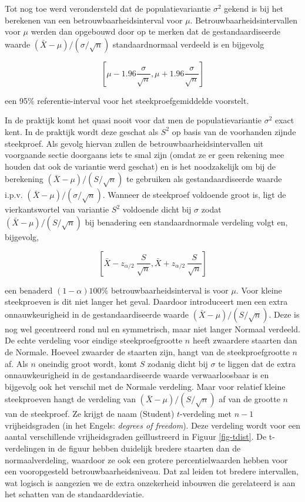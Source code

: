 \documentclass[
  dutch,
  letterpaper,
  12pt]{book}
\theoremstyle{definition}
\theoremstyle{definition}
\theoremstyle{definition}
\theoremstyle{remark}
\begin{document}
Tot nog toe werd verondersteld dat de populatievariantie \(\sigma^2\)
gekend is bij het berekenen van een betrouwbaarheidsinterval voor
\(\mu\). Betrouwbaarheidsintervallen voor \(\mu\) werden dan opgebouwd
door op te merken dat de gestandaardiseerde waarde
\((\bar{X} - \mu)/(\sigma/\sqrt{n})\) standaardnormaal verdeeld is en
bijgevolg

\begin{equation*}
\left[\mu - 1.96 \frac{\sigma}{\sqrt{n}},\mu + 1.96 \frac{\sigma}{\sqrt{n}}%
\right]
\end{equation*}

een 95\% referentie-interval voor het steekproefgemiddelde voorstelt.

In de praktijk komt het quasi nooit voor dat men de populatievariantie
\(\sigma^2\) exact kent. In de praktijk wordt deze geschat als \(S^2\)
op basis van de voorhanden zijnde steekproef. Als gevolg hiervan zullen
de betrouwbaarheidsintervallen uit voorgaande sectie doorgaans iets te
smal zijn (omdat ze er geen rekening mee houden dat ook de variantie
werd geschat) en is het noodzakelijk om bij de berekening
\((\bar{X} - \mu)/(S/\sqrt{n})\) te gebruiken als gestandaardiseerde
waarde i.p.v. \((\bar{X} - \mu)/(\sigma/\sqrt{n})\). Wanneer de
steekproef voldoende groot is, ligt de vierkantswortel van variantie
\(S^2\) voldoende dicht bij \(\sigma\) zodat
\({(\bar{X} - \mu)}/{(S/\sqrt{n}) }\) bij benadering een
standaardnormale verdeling volgt en, bijgevolg,

\[
\left[\bar{X} - z_{\alpha/2} \ \frac{S}{\sqrt{n}} , \bar{X} + z_{\alpha/2} \
\frac{S}{\sqrt{n}}\right]
\]

een benaderd \((1- \alpha)100\%\) betrouwbaarheidsinterval is voor
\(\mu\). Voor kleine steekproeven is dit niet langer het geval. Daardoor
introduceert men een extra onnauwkeurigheid in de gestandaardiseerde
waarde \({(\bar{X} - \mu)}/{(S/\sqrt{n})}\). Deze is nog wel gecentreerd
rond nul en symmetrisch, maar niet langer Normaal verdeeld. De echte
verdeling voor eindige steekproefgrootte \(n\) heeft zwaardere staarten
dan de Normale. Hoeveel zwaarder de staarten zijn, hangt van de
steekproefgrootte \(n\) af. Als \(n\) oneindig groot wordt, komt \(S\)
zodanig dicht bij \(\sigma\) te liggen dat de extra onnauwkeurigheid in
de gestandaardiseerde waarde verwaarloosbaar is en bijgevolg ook het
verschil met de Normale verdeling. Maar voor relatief kleine
steekproeven hangt de verdeling van \({(\bar{X} - \mu)}/({S/\sqrt{n}})\)
af van de grootte \(n\) van de steekproef. Ze krijgt de naam (Student)
\(t\)-verdeling met \(n-1\) vrijheidsgraden (in het Engels:
\emph{degrees of freedom}). Deze verdeling wordt voor een aantal
verschillende vrijheidsgraden geïllustreerd in Figuur \ref{fig-tdist}.
De t-verdelingen in de figuur hebben duidelijk bredere staarten dan de
normaalverdeling, waardoor ze ook een grotere percentielwaarden hebben
voor een vooropgesteld betrouwbaarheidsniveau. Dat zal leiden tot
bredere intervallen, wat logisch is aangezien we de extra onzekerheid
inbouwen die gerelateerd is aan het schatten van de standaarddeviatie.
\end{document}
